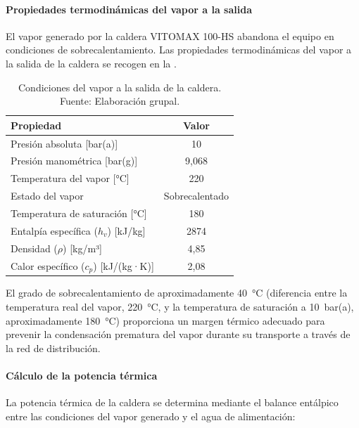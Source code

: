 \documentclass[12pt]{article}
\begin{document}
\paragraph{Propiedades termodinámicas del vapor a la salida}

El vapor generado por la caldera VITOMAX 100-HS abandona el equipo en condiciones de sobrecalentamiento. Las propiedades termodinámicas del vapor a la salida de la caldera se recogen en la .

\begin{table}[H]
	\centering
	\caption{Condiciones del vapor a la salida de la caldera. Fuente: Elaboración grupal.}
	\label{tab:condiciones-salida-caldera}
	\begin{tabular}{lc}
		\toprule
		\textbf{Propiedad}                   & \textbf{Valor} \\
		\midrule
		Presión absoluta [bar(a)]            & 10             \\
		Presión manométrica [bar(g)]         & 9,068          \\
		Temperatura del vapor [°C]           & 220            \\
		Estado del vapor                     & Sobrecalentado \\
		Temperatura de saturación [°C]       & 180            \\
		Entalpía específica ($h_v$) [kJ/kg]  & 2874           \\
		Densidad ($\rho$) [kg/m³]            & 4,85           \\
		Calor específico ($c_p$) [kJ/(kg·K)] & 2,08           \\
		\bottomrule
	\end{tabular}
\end{table}

El grado de sobrecalentamiento de aproximadamente 40~°C (diferencia entre la temperatura real del vapor, 220~°C, y la temperatura de saturación a 10~bar(a), aproximadamente 180~°C) proporciona un margen térmico adecuado para prevenir la condensación prematura del vapor durante su transporte a través de la red de distribución.

\paragraph{Cálculo de la potencia térmica}

La potencia térmica de la caldera se determina mediante el balance entálpico entre las condiciones del vapor generado y el agua de alimentación:
\end{document}
